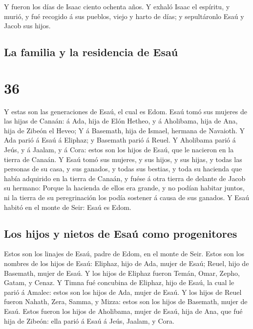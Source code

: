  Y fueron los días de Isaac ciento ochenta años.
 Y exhaló Isaac el espíritu, y murió, y fué recogido á
sus pueblos, viejo y harto de días; y sepultáronlo Esaú y Jacob sus
hijos.

\hypertarget{la-familia-y-la-residencia-de-esauxfa}{%
\subsection{La familia y la residencia de
Esaú}\label{la-familia-y-la-residencia-de-esauxfa}}

\hypertarget{section-01-36}{%
\section{36}\label{section-01-36}}

 Y estas son las generaciones de Esaú, el cual es Edom.
 Esaú tomó sus mujeres de las hijas de Canaán: á Ada, hija
de Elón Hetheo, y á Aholibama, hija de Ana, hija de Zibeón el Heveo;
 Y á Basemath, hija de Ismael, hermana de Navaioth.
 Y Ada parió á Esaú á Eliphaz; y Basemath parió á Reuel.
 Y Aholibama parió á Jeús, y á Jaalam, y á Cora: estos son
los hijos de Esaú, que le nacieron en la tierra de Canaán.
 Y Esaú tomó sus mujeres, y sus hijos, y sus hijas, y
todas las personas de su casa, y sus ganados, y todas sus bestias, y
toda su hacienda que había adquirido en la tierra de Canaán, y fuése á
otra tierra de delante de Jacob su hermano:  Porque la
hacienda de ellos era grande, y no podían habitar juntos, ni la tierra
de su peregrinación los podía sostener á causa de sus ganados.
 Y Esaú habitó en el monte de Seir: Esaú es Edom.

\hypertarget{los-hijos-y-nietos-de-esauxfa-como-progenitores}{%
\subsection{Los hijos y nietos de Esaú como
progenitores}\label{los-hijos-y-nietos-de-esauxfa-como-progenitores}}

 Estos son los linajes de Esaú, padre de Edom, en el monte
de Seir.  Estos son los nombres de los hijos de Esaú:
Eliphaz, hijo de Ada, mujer de Esaú; Reuel, hijo de Basemath, mujer de
Esaú.  Y los hijos de Eliphaz fueron Temán, Omar, Zepho,
Gatam, y Cenaz.  Y Timna fué concubina de Eliphaz, hijo
de Esaú, la cual le parió á Amalec: estos son los hijos de Ada, mujer de
Esaú.  Y los hijos de Reuel fueron Nahath, Zera, Samma, y
Mizza: estos son los hijos de Basemath, mujer de Esaú. 
Estos fueron los hijos de Aholibama, mujer de Esaú, hija de Ana, que fué
hija de Zibeón: ella parió á Esaú á Jeús, Jaalam, y Cora.

